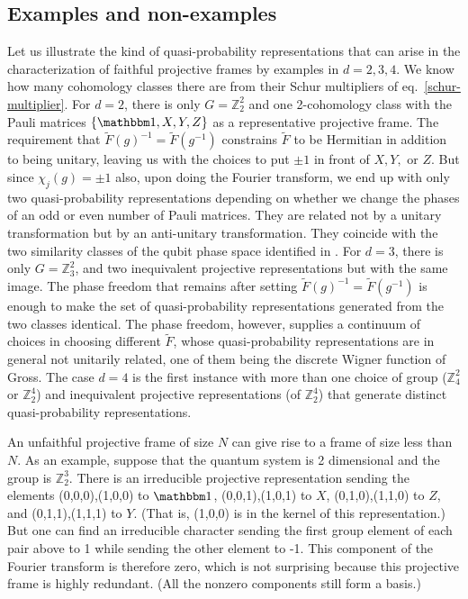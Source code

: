 \subsection{Examples and non-examples}

Let us illustrate the kind of quasi-probability representations that can arise in the characterization of faithful projective frames by examples in $d=2,3,4$. We know how many cohomology classes there are from their Schur multipliers of eq.~\eqref{schur-multiplier}. For $d=2$, there is only $G=\mathbb{Z}_{2}^{2}$ and one 2-cohomology class with the Pauli matrices $\{ \id,X,Y,Z \} $ as a representative projective frame. The requirement that $\tilde{F}(g)^{-1}=\tilde{F}(g^{-1})$ constrains $\tilde{F}$ to be Hermitian in addition to being unitary, leaving us with the choices to put $\pm1$ in front of $X,Y,$ or $Z$. But since $\chi_{j}(g)=\pm1$ also, upon doing the Fourier transform, we end up with only two quasi-probability representations depending on whether we change the phases of an odd or even number of Pauli matrices. They are related not by a unitary transformation but by an anti-unitary transformation. They coincide with the two similarity classes of the qubit phase space identified in \cite{gibbons_discrete_2004}. For $d=3$, there is only $G=\mathbb{Z}_3^2$, and two inequivalent projective representations but with the same image. The phase freedom that remains after setting $\tilde{F}(g)^{-1}=\tilde{F}(g^{-1})$ is enough to make the set of quasi-probability representations generated from the two classes identical. The phase freedom, however, supplies a continuum of choices in choosing different $\tilde{F}$, whose quasi-probability representations are in general not unitarily related, one of them being the discrete Wigner function of Gross. The case $d=4$ is the first instance with more than one choice of group ($\mathbb{Z}_4^2$ or $\mathbb{Z}_2^4$) and inequivalent projective representations (of $\mathbb{Z}_2^4$) that generate distinct quasi-probability representations.

An unfaithful projective frame of size $N$ can give rise to a frame of size less than $N$. As an example, suppose that the quantum system is 2 dimensional and the group is $\mathbb{Z}_2^3$. There is an irreducible projective representation sending the elements (0,0,0),(1,0,0) to $\id$, (0,0,1),(1,0,1) to $X$, (0,1,0),(1,1,0) to $Z$, and (0,1,1),(1,1,1) to $Y$. (That is, (1,0,0) is in the kernel of this representation.) But one can find an irreducible character sending the first group element of each pair above to 1 while sending the other element to -1. This component of the Fourier transform is therefore zero, which is not surprising because this projective frame is highly redundant. (All the nonzero components still form a basis.)

